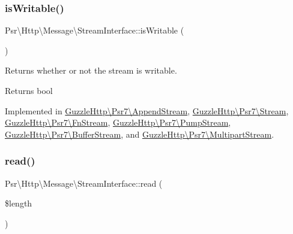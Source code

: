 \subsubsection{\texorpdfstring{is\+Writable()}{isWritable()}}
{\footnotesize\ttfamily Psr\textbackslash{}\+Http\textbackslash{}\+Message\textbackslash{}\+Stream\+Interface\+::is\+Writable (\begin{DoxyParamCaption}{ }\end{DoxyParamCaption})}

Returns whether or not the stream is writable.

\begin{DoxyReturn}{Returns}
bool 
\end{DoxyReturn}


Implemented in \hyperlink{classGuzzleHttp_1_1Psr7_1_1AppendStream_af63f6bfc1c273407b55b82ad6e4b9e74}{Guzzle\+Http\textbackslash{}\+Psr7\textbackslash{}\+Append\+Stream}, \hyperlink{classGuzzleHttp_1_1Psr7_1_1Stream_a12a133d09c80a10b63d5194dcbb6be95}{Guzzle\+Http\textbackslash{}\+Psr7\textbackslash{}\+Stream}, \hyperlink{classGuzzleHttp_1_1Psr7_1_1FnStream_a4ea21aece18cb3b83315dba95dcac9c7}{Guzzle\+Http\textbackslash{}\+Psr7\textbackslash{}\+Fn\+Stream}, \hyperlink{classGuzzleHttp_1_1Psr7_1_1PumpStream_ae14fa2b120954daabe0ed00b3492b180}{Guzzle\+Http\textbackslash{}\+Psr7\textbackslash{}\+Pump\+Stream}, \hyperlink{classGuzzleHttp_1_1Psr7_1_1BufferStream_a5d04843eba2948128ff79da1019a7034}{Guzzle\+Http\textbackslash{}\+Psr7\textbackslash{}\+Buffer\+Stream}, and \hyperlink{classGuzzleHttp_1_1Psr7_1_1MultipartStream_a7062382f637d4b6b2b953040c916dde9}{Guzzle\+Http\textbackslash{}\+Psr7\textbackslash{}\+Multipart\+Stream}.

\mbox{\label{interfacePsr_1_1Http_1_1Message_1_1StreamInterface_ad41b4afe827e179dfb4b988e98cccb12}} 
\subsubsection{\texorpdfstring{read()}{read()}}
{\footnotesize\ttfamily Psr\textbackslash{}\+Http\textbackslash{}\+Message\textbackslash{}\+Stream\+Interface\+::read (\begin{DoxyParamCaption}\item[{}]{\$length }\end{DoxyParamCaption})}

